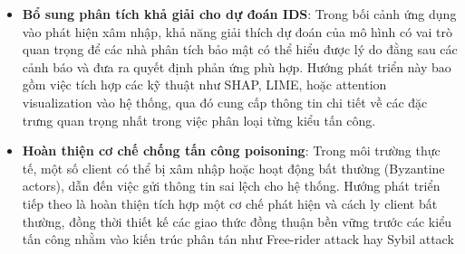 \begin{itemize}
    
    
    \item \textbf{Bổ sung phân tích khả giải cho dự đoán IDS}: Trong bối cảnh ứng dụng vào phát hiện xâm nhập, khả năng giải thích dự đoán của mô hình có vai trò quan trọng để các nhà phân tích bảo mật có thể hiểu được lý do đằng sau các cảnh báo và đưa ra quyết định phản ứng phù hợp. Hướng phát triển này bao gồm việc tích hợp các kỹ thuật như SHAP, LIME, hoặc attention visualization vào hệ thống, qua đó cung cấp thông tin chi tiết về các đặc trưng quan trọng nhất trong việc phân loại từng kiểu tấn công.
    
    \item \textbf{Hoàn thiện cơ chế chống tấn công poisoning}: Trong môi trường thực tế, một số client có thể bị xâm nhập hoặc hoạt động bất thường (Byzantine actors), dẫn đến việc gửi thông tin sai lệch cho hệ thống. Hướng phát triển tiếp theo là hoàn thiện tích hợp một cơ chế phát hiện và cách ly client bất thường, đồng thời thiết kế các giao thức đồng thuận bền vững trước các kiểu tấn công nhằm vào kiến trúc phân tán như Free-rider attack hay Sybil attack \cite{douceur2002sybil}
\end{itemize}
